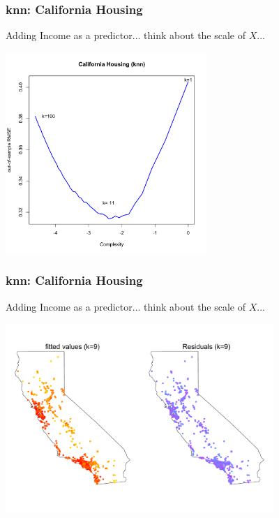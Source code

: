 \documentclass[flegn]{beamer}
\begin{document}
\begin{frame}
\frametitle{knn: California Housing}
Adding Income as a predictor... think about the scale of $X$... 
\begin{center}
\includegraphics[width=3in]{CALknnIcome}
\end{center}
\end{frame}


\begin{frame}
\frametitle{knn: California Housing}
Adding Income as a predictor... think about the scale of $X$...
\vspace{-0.6cm}
\begin{center}
\includegraphics[width=4in]{CALIncomek9}
\end{center}
\end{frame}
\end{document}
